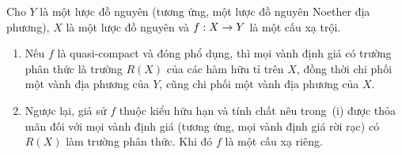 \documentclass[oneside,10pt]{amsart}
\makeatletter
\newcommand{\ega@arrow}[2]{\mathchoice{#1}{#2}{#2}{#2}}
\renewcommand{\to}{\ega@arrow{\longrightarrow}{\rightarrow}}
\let\EGAOriginalLabel\label
\renewcommand{\label}[1]{\phantomsection\EGAOriginalLabel{#1}}
\makeatother
\begin{document}
\begin{corollary}[7.3.10]
\label{II.7.3.10}
Cho $Y$ là một lược đồ nguyên (tương ứng, một lược đồ nguyên Noether địa phương), $X$ là một lược đồ nguyên và $f:X\to Y$ là một cấu xạ trội.
\begin{enumerate}
  \item[\rm{(i)}] Nếu $f$ là quasi-compact và đóng phổ dụng, thì mọi vành định giá có trường phân thức là trường $R(X)$ của các hàm hữu tỉ trên $X$, đồng thời chi phối một vành địa phương của $Y$, cũng chi phối một vành địa phương của $X$.
  \item[\rm{(ii)}] Ngược lại, giả sử $f$ thuộc kiểu hữu hạn và tính chất nêu trong~(i) được thỏa mãn đối với mọi vành định giá (tương ứng, mọi vành định giá rời rạc) có $R(X)$ làm trường phân thức.
  Khi đó $f$ là một cấu xạ riêng.
\end{enumerate}
\end{corollary}
\end{document}
